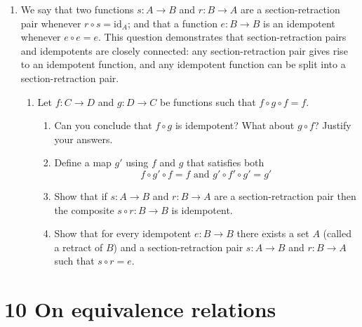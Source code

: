 \documentclass[10pt,\jkfside,a4paper]{article}
\begin{document}
\begin{enumerate}

\item We say that two functions $s: A \rightarrow B$ and $r: B \rightarrow A$ are a section-retraction pair whenever 
$r \circ s = \text{id}_A$; and that a function $e: B \rightarrow B$ is an idempotent whenever $e \circ e = e$. This question 
demonstrates that section-retraction pairs and idempotents are closely connected: any section-retraction pair 
gives rise to an idempotent function, and any idempotent function can be split into a section-retraction pair.

\begin{enumerate}

\item Let $f: C \rightarrow D$ and $g: D \rightarrow C$ be functions such that $f \circ g \circ f = f$.

\begin{enumerate}[label=(\roman*)]

\item Can you conclude that $f \circ g$ is idempotent? What about $g \circ f$? Justify your answers.



\item Define a map $g'$ using $f$ and $g$ that satisfies both
\begin{equation}
f \circ g' \circ f = f \text{ and } g' \circ f' \circ g' = g'
\end{equation}



\item Show that if $s: A \rightarrow B$ and $r: B \rightarrow A$ are a section-retraction pair then 
the composite $s \circ r: B \rightarrow B$ is idempotent.



\item Show that for every idempotent $e: B \rightarrow B$ there exists a set $A$ (called a retract of $B$) and 
a section-retraction pair $s: A \rightarrow B$ and $r: B \rightarrow A$ such that $s \circ r = e$.



\end{enumerate}

\end{enumerate}

\end{enumerate}

\section*{10 On equivalence relations}
\end{document}
